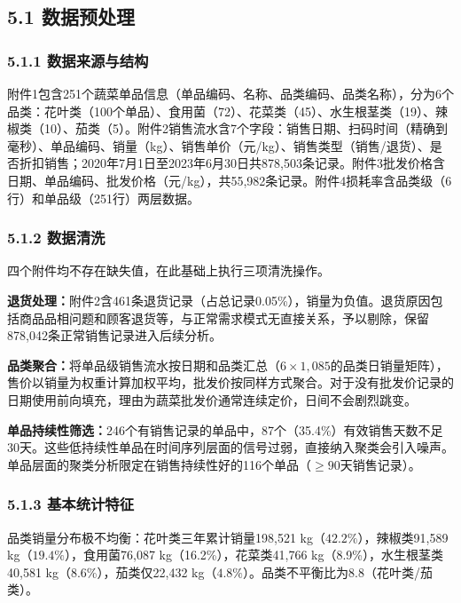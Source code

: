 \documentclass[12pt,a4paper]{article}
\begin{document}
\subsection{5.1 数据预处理}

\subsubsection{5.1.1 数据来源与结构}

附件1包含251个蔬菜单品信息（单品编码、名称、品类编码、品类名称），分为6个品类：花叶类（100个单品）、食用菌（72）、花菜类（45）、水生根茎类（19）、辣椒类（10）、茄类（5）。附件2销售流水含7个字段：销售日期、扫码时间（精确到毫秒）、单品编码、销量（kg）、销售单价（元/kg）、销售类型（销售/退货）、是否折扣销售；2020年7月1日至2023年6月30日共878,503条记录。附件3批发价格含日期、单品编码、批发价格（元/kg），共55,982条记录。附件4损耗率含品类级（6行）和单品级（251行）两层数据。

\subsubsection{5.1.2 数据清洗}

四个附件均不存在缺失值，在此基础上执行三项清洗操作。

\textbf{退货处理：}附件2含461条退货记录（占总记录0.05\%），销量为负值。退货原因包括商品品相问题和顾客退货等，与正常需求模式无直接关系，予以剔除，保留878,042条正常销售记录进入后续分析。

\textbf{品类聚合：}将单品级销售流水按日期和品类汇总（$6 \times 1,085$的品类日销量矩阵），售价以销量为权重计算加权平均，批发价按同样方式聚合。对于没有批发价记录的日期使用前向填充，理由为蔬菜批发价通常连续定价，日间不会剧烈跳变。

\textbf{单品持续性筛选：}246个有销售记录的单品中，87个（35.4\%）有效销售天数不足30天。这些低持续性单品在时间序列层面的信号过弱，直接纳入聚类会引入噪声。单品层面的聚类分析限定在销售持续性好的116个单品（$\geq 90$天销售记录）。

\subsubsection{5.1.3 基本统计特征}

品类销量分布极不均衡：花叶类三年累计销量198,521 kg（$\mathbf{42.2\%}$），辣椒类91,589 kg（$\mathbf{19.4\%}$），食用菌76,087 kg（16.2\%），花菜类41,766 kg（8.9\%），水生根茎类40,581 kg（8.6\%），茄类仅22,432 kg（$\mathbf{4.8\%}$）。品类不平衡比为8.8（花叶类/茄类）。
\end{document}
